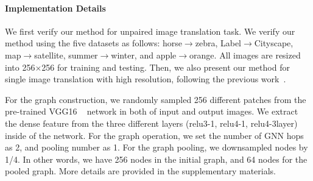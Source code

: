 \documentclass[letterpaper]{article} %
\begin{document}
\paragraph{Implementation Details}
We first verify our method for unpaired image translation task. 
We verify our method using the five datasets as follows: horse$\rightarrow$zebra, Label$\rightarrow$Cityscape, map$\rightarrow$satellite, summer$\rightarrow$winter, and {apple$\rightarrow$orange}. All images are resized into 256$\times$256 for training and testing. Then, we also present our method for single image translation with high resolution, following the previous work~\cite{cut}. 

For the graph construction, we randomly sampled 256 different patches from the pre-trained VGG16 ~\cite{vgg} network in both of input and output images. We extract the dense feature from the three different layers (relu3-1, relu4-1, relu4-3layer) inside of the network. For the graph operation, we set the number of GNN hops as 2, and pooling number as 1. For the graph pooling, we downsampled nodes by 1/4. In other words, we have 256 nodes in the initial graph, and 64 nodes for the pooled graph. 
More details are provided in the supplementary materials.







\end{document}
